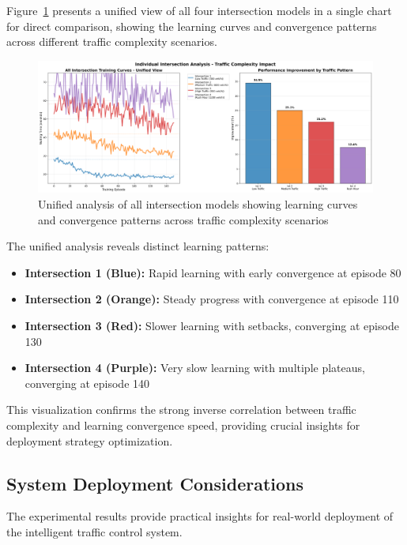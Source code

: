Figure~\ref{fig:unified_intersection_analysis} presents a unified view of all four intersection 
models in a single chart for direct comparison, showing the learning curves and convergence patterns 
across different traffic complexity scenarios.

\begin{figure}[!htb]
    \centering
    \includegraphics[width=\textwidth]{figures/ch4_unified_intersection_analysis.png}
    \caption{Unified analysis of all intersection models showing learning curves and convergence patterns across traffic complexity scenarios}
    \label{fig:unified_intersection_analysis}
\end{figure}

The unified analysis reveals distinct learning patterns:
\begin{itemize}
    \item \textbf{Intersection 1 (Blue):} Rapid learning with early convergence at episode 80
    \item \textbf{Intersection 2 (Orange):} Steady progress with convergence at episode 110
    \item \textbf{Intersection 3 (Red):} Slower learning with setbacks, converging at episode 130
    \item \textbf{Intersection 4 (Purple):} Very slow learning with multiple plateaus, converging at episode 140
\end{itemize}

This visualization confirms the strong inverse correlation between traffic complexity and learning 
convergence speed, providing crucial insights for deployment strategy optimization.

\subsection{System Deployment Considerations}\label{subsec2b-5}

The experimental results provide practical insights for real-world deployment of the intelligent 
traffic control system.


